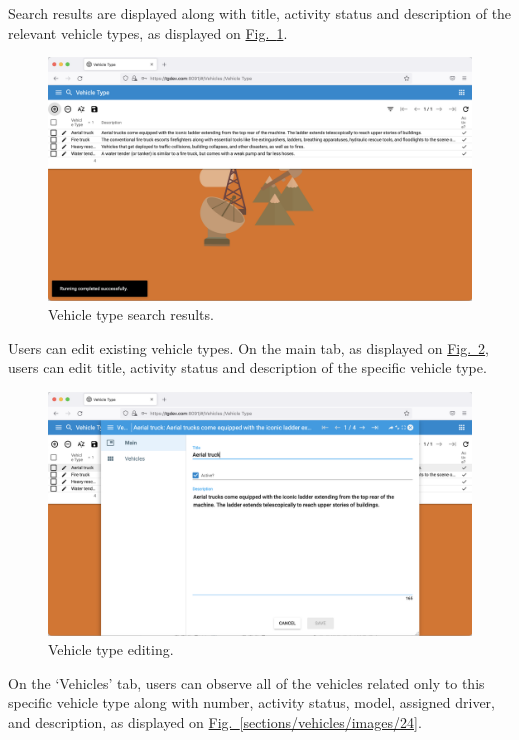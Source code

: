 \newpage
Search results are displayed along with title, activity status and description of the relevant vehicle types, as displayed on \hyperref[sections/vehicles/images/22]{Fig.~\ref*{sections/vehicles/images/22}}.

    \begin{figure}[!htbp]
	\centering
	\includegraphics[width=0.95\linewidth]{sections/vehicles/images/22.png}
	\caption{Vehicle type search results.}\label{sections/vehicles/images/22}
	\end{figure}

\newpage
Users can edit existing vehicle types. On the main tab, as displayed on \hyperref[sections/vehicles/images/23]{Fig.~\ref*{sections/vehicles/images/23}}, users can edit title, activity status and description of the specific vehicle type.


    \begin{figure}[!htbp]
	\centering
	\includegraphics[width=0.95\linewidth]{sections/vehicles/images/23.png}
	\caption{Vehicle type editing.}\label{sections/vehicles/images/23}
	\end{figure}
	
\newpage	
On the ‘Vehicles’ tab, users can observe all of the vehicles related only to this specific vehicle type along with number, activity status, model, assigned driver, and description, as displayed on \hyperref[sections/vehicles/images/24]{Fig.~\ref*{sections/vehicles/images/24}}.

